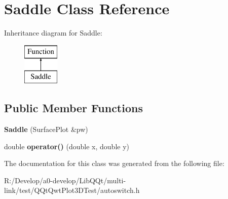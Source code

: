 \hypertarget{class_saddle}{}\section{Saddle Class Reference}
\label{class_saddle}
Inheritance diagram for Saddle\+:\begin{figure}[H]
\begin{center}
\leavevmode
\includegraphics[height=2.000000cm]{class_saddle}
\end{center}
\end{figure}
\subsection*{Public Member Functions}
\begin{DoxyCompactItemize}
\item 
\mbox{\label{class_saddle_a2e2679cf70fffe17e2b444d9e6219dc2}} 
{\bfseries Saddle} (Surface\+Plot \&pw)
\item 
\mbox{\label{class_saddle_af4532075eacd66f233b08baeb15d64fb}} 
double {\bfseries operator()} (double x, double y)
\end{DoxyCompactItemize}


The documentation for this class was generated from the following file\+:\begin{DoxyCompactItemize}
\item 
R\+:/\+Develop/a0-\/develop/\+Lib\+Q\+Qt/multi-\/link/test/\+Q\+Qt\+Qwt\+Plot3\+D\+Test/autoswitch.\+h\end{DoxyCompactItemize}
